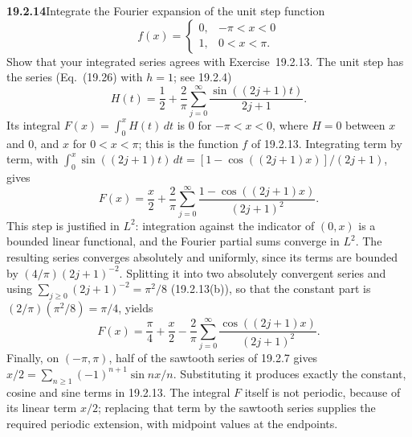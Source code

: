 \par\bigskip
\noindent\textbf{19.2.14}\quad Integrate the Fourier expansion of
the unit step function
\[
f(x)=\begin{cases}
0, & -\pi<x<0\\
1, & 0<x<\pi.
\end{cases}
\]
Show that your integrated series agrees with Exercise~19.2.13.
\solution
The unit step has the series (Eq.~(19.26) with $h=1$; see 19.2.4)
\[
H(t)=\frac12+\frac2\pi\sum_{j=0}^{\infty}
\frac{\sin((2j+1)t)}{2j+1}.
\]
Its integral $F(x)=\int_0^xH(t)\,dt$ is $0$ for $-\pi<x<0$, where $H=0$
between $x$ and $0$, and $x$ for $0<x<\pi$; this is the function $f$
of 19.2.13. Integrating term by term, with
$\int_0^x\sin((2j+1)t)\,dt=[1-\cos((2j+1)x)]/(2j+1)$, gives
\[
F(x)=\frac x2+\frac2\pi\sum_{j=0}^{\infty}
\frac{1-\cos((2j+1)x)}{(2j+1)^2}.
\]
This step is justified in $L^2$: integration against the indicator of
$(0,x)$ is a bounded linear functional, and the Fourier partial sums
converge in $L^2$. The resulting series converges absolutely and
uniformly, since its terms are bounded by $(4/\pi)(2j+1)^{-2}$.
Splitting it into two absolutely convergent series and using
$\sum_{j\ge0}(2j+1)^{-2}=\pi^2/8$ (19.2.13(b)), so that the constant part
is $(2/\pi)(\pi^2/8)=\pi/4$, yields
\[
F(x)=\frac\pi4+\frac x2-\frac2\pi\sum_{j=0}^{\infty}
\frac{\cos((2j+1)x)}{(2j+1)^2}.
\]
Finally, on $(-\pi,\pi)$, half of the sawtooth series of 19.2.7 gives
$x/2=\sum_{n\ge1}(-1)^{n+1}\sin nx/n$. Substituting it produces
exactly the constant, cosine and sine terms in 19.2.13. The integral
$F$ itself is not periodic, because of its linear term $x/2$; replacing
that term by the sawtooth series supplies the required periodic
extension, with midpoint values at the endpoints.


